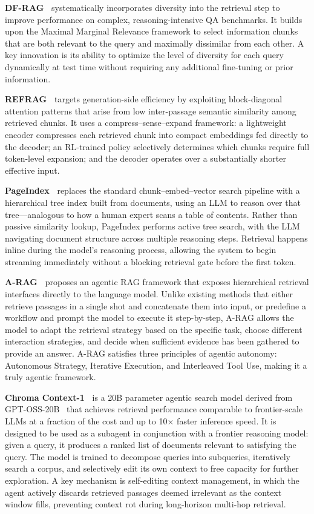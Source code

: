 \noindent
\textbf{DF-RAG~\cite{khan-etal-2026-df}} systematically incorporates diversity into the retrieval step to improve performance on complex, reasoning-intensive QA benchmarks. It builds upon the Maximal Marginal Relevance framework to select information chunks that are both relevant to the query and maximally dissimilar from each other. A key innovation is its ability to optimize the level of diversity for each query dynamically at test time without requiring any additional fine-tuning or prior information.

\noindent
\textbf{REFRAG~\cite{lin2025refrag}} targets generation-side efficiency by exploiting block-diagonal attention patterns that arise from low inter-passage semantic similarity among retrieved chunks. It uses a compress–sense–expand framework: a lightweight encoder compresses each retrieved chunk into compact embeddings fed directly to the decoder; an RL-trained policy selectively determines which chunks require full token-level expansion; and the decoder operates over a substantially shorter effective input.

\noindent
\textbf{PageIndex~\cite{zhang2025pageindex}} replaces the standard chunk–embed–vector search pipeline with a hierarchical tree index built from documents, using an LLM to reason over that tree—analogous to how a human expert scans a table of contents.  Rather than passive similarity lookup, PageIndex performs active tree search, with the LLM navigating document structure across multiple reasoning steps. Retrieval happens inline during the model's reasoning process, allowing the system to begin streaming immediately without a blocking retrieval gate before the first token.

\noindent
\textbf{A-RAG~\cite{du2026aragscalingagenticretrievalaugmented}} proposes an agentic RAG framework that exposes hierarchical retrieval interfaces directly to the language model. Unlike existing methods that either retrieve passages in a single shot and concatenate them into input, or predefine a workflow and prompt the model to execute it step-by-step, A-RAG allows the model to adapt the retrieval strategy based on the specific task, choose different interaction strategies, and decide when sufficient evidence has been gathered to provide an answer. A-RAG satisfies three principles of agentic autonomy: Autonomous Strategy, Iterative Execution, and Interleaved Tool Use, making it a truly agentic framework.

\noindent
\textbf{Chroma Context-1~\cite{bashir2026context1}} is a 20B parameter agentic search model derived from \textsc{GPT-OSS-20B}~\cite{openai2025gptoss120bgptoss20bmodel} that achieves retrieval performance comparable to frontier-scale LLMs at a fraction of the cost and up to 10$\times$ faster inference speed. It is designed to be used as a subagent in conjunction with a frontier reasoning model: given a query, it produces a ranked list of documents relevant to satisfying the query. The model is trained to decompose queries into subqueries, iteratively search a corpus, and selectively edit its own context to free capacity for further exploration.  A key mechanism is self-editing context management, in which the agent actively discards retrieved passages deemed irrelevant as the context window fills, preventing context rot during long-horizon multi-hop retrieval.